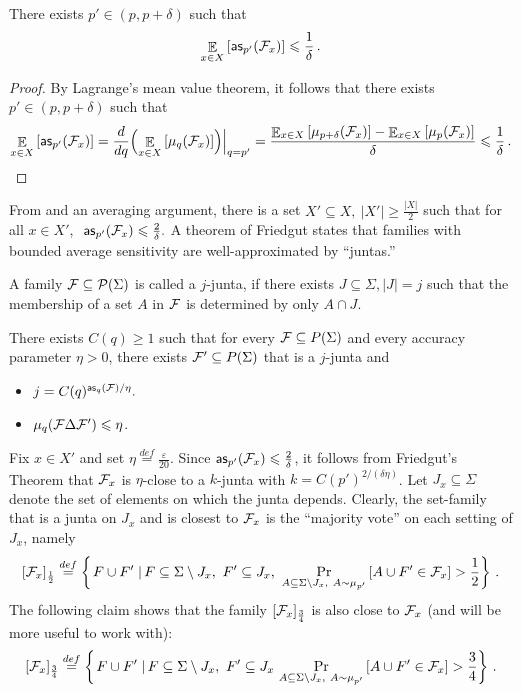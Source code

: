 \documentclass{toc}
\newcommand\sett[2]{\left\{ \left. #1 \;\right\vert #2 \right\}}
\newcommand\Prob[2]{{\Pr_{#1}\left[ {#2} \right]}}
\newcommand\half{{1\over2}}
\newcommand\defeq{\stackrel{def}{=}}
\newcommand\Expect[2]{{\mathop{\mathbb{E}}_{#1}\left[ {#2} \right]}}
\newcommand\eps{\varepsilon}
\renewcommand\geq{\geqslant}
\begin{document}
\begin{claim}\label{clm:as}
There exists $p'\in (p,p+\delta)$ such that
\[
\Expect{x\in X}{{\sf as}_{p'}({\cal F}_x)} \leqslant \frac{1}{\delta}\,.%
\]
\end{claim}
\begin{proof}
By Lagrange's mean value theorem, it follows that there exists $p'\in (p,p+\delta)$ such that
\[
\Expect{x\in X}{{\sf as}_{p'}({\cal F}_x)}=
\frac{d}{dq}\Big( \Expect{x\in X}{\mu_{q}({\cal F}_x)}     \Big) \Big|_{q=p'} =
\frac
{
\Expect{x\in X}{\mu_{p+\delta}({\cal F}_x)}
-\Expect{x\in X}{\mu_{p}({\cal F}_x)}
}
{\delta}
\leqslant \frac{1}{\delta}\,.   \qedhere%
\]
\end{proof}
From  and an averaging argument, there is a set $X' \subseteq X, ~|X'| \geq \frac{|X|}{2}$ such that
for all $x \in X'$, $~{\sf as}_{p'}({\cal F}_x)\leqslant \frac{2}{\delta}.$ A theorem of Friedgut states that families
with bounded average sensitivity are well-approximated by ``juntas.''

\begin{definition}[Junta]
A family ${\cal F}\subseteq {\cal P}(\Sigma)$ is called a $j$-junta, if there exists $J\subseteq \Sigma, |J|=j$ such that the membership of a set
$A$ in ${\cal F}$ is determined by only $A\cap J$.
\end{definition}



\begin{theorem}
There exists %
$C(q) \geq 1$ such that for every
${\cal F}\subseteq P(\Sigma)$ and %
every  %
accuracy parameter $\eta>0$,
there exists ${\cal F}'\subseteq P(\Sigma)$ that is a $j$-junta and
\begin{itemize}
\item $j = C(q)^{ {\sf as}_q ({\cal F})/\eta}. $
\item $\mu_{q}({\cal F}\Delta{\cal F}')\leqslant \eta$.
\end{itemize}
\end{theorem}

Fix $x\in X'$ and set $\eta\defeq \frac{\eps}{20}$.
Since ${\sf as}_{p'}({\cal F}_x) \leqslant \frac{2}{\delta}$,
it follows from Friedgut's Theorem that ${\cal F}_x$ is $\eta$-close to a $k$-junta with $k = C(p')^{2/(\delta \eta)}$. Let $J_x \subseteq \Sigma$
denote the set of elements  on which the junta depends. Clearly, the set-family that is a junta on $J_x$ and is closest to ${\cal F}_x$
 is the ``majority vote'' on each setting of $J_x$, namely
\[
[{\cal F}_x]_\half\defeq \sett{F\cup F'}{F\subseteq\Sigma\setminus J_x, ~F' \subseteq J_x, ~\Prob{A\subseteq \Sigma\setminus J_x, ~A \sim \mu_{p'}}{A\cup F'\in{\cal F}_x} > \half}\,.%
\]
The following claim shows that the family $[{\cal F}_x]_{\frac{3}{4}}$ is also close to ${\cal F}_x$ (and will be more useful to work with):
\[
[{\cal F}_x]_{\frac{3}{4}}\defeq \sett{F\cup F'}{F\subseteq\Sigma\setminus J_x, ~F'\subseteq J_x ~\Prob{A\subseteq \Sigma\setminus J_x, ~A\sim \mu_{p'}}{A\cup F'\in {\cal F}_x} > \frac{3}{4}}\,.%
\]
\end{document}
